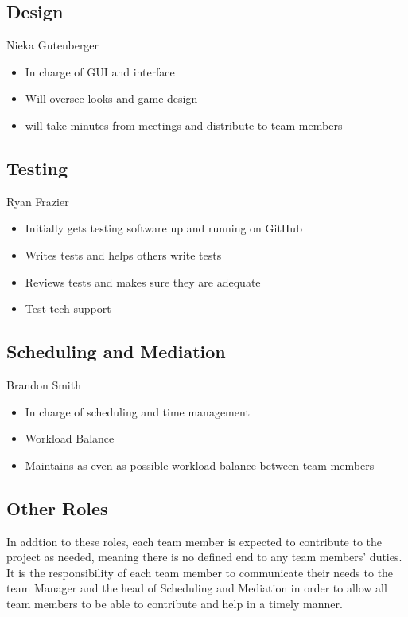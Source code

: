 \documentclass[11pt, titlepage]{article}
\begin{document}
    \subsection{Design}
		Nieka Gutenberger
		\begin{itemize}
			\item In charge of GUI and interface
    		\item Will oversee looks and game design
    		\item will take minutes from meetings and distribute to team members
		\end{itemize}

    \subsection{Testing}
		Ryan Frazier
		\begin{itemize}
			\item Initially gets testing software up and running on GitHub
	  		\item Writes tests and helps others write tests
    		\item Reviews tests and makes sure they are adequate
    		\item Test tech support
		\end{itemize}

    \subsection{Scheduling and Mediation}
	    Brandon Smith
   		\begin{itemize}
    		\item In charge of scheduling and time management
    		\item Workload Balance
    		\item Maintains as even as possible workload balance between team members
		\end{itemize}

     \subsection{Other Roles}
   	In addtion to these roles, each team member is expected to contribute to the project as needed, meaning there is no defined end to any team members' duties.  It is the responsibility of each team member to communicate their needs to the team Manager and the head of Scheduling and Mediation in order to allow all team members to be able to contribute and help in a timely manner.
\end{document}
